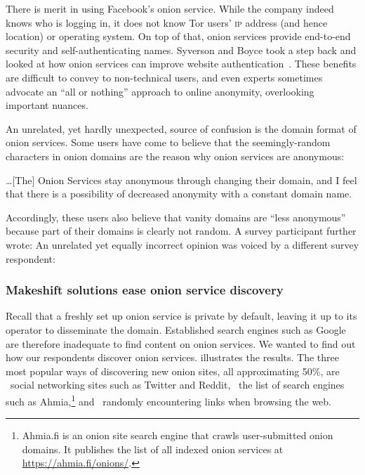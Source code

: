 There is merit in using Facebook's onion service.  While the company indeed
knows who is logging in, it does not know Tor users' \textsc{ip} address (and
hence location) or operating system.  On top of that, onion services provide
end-to-end security and self-authenticating names.  Syverson and Boyce took a
step back and looked at how onion services can improve website
authentication~\cite{Syverson2015a}.  These benefits are difficult to convey to
non-technical users, and even experts sometimes advocate an ``all or nothing''
approach to online anonymity, overlooking important nuances.

An unrelated, yet hardly unexpected, source of confusion is the domain format of
onion services.  Some users have come to believe that the seemingly-random
characters in onion domains are the reason why onion services are anonymous:

\begin{displayquote}
\ldots [The] Onion Services stay anonymous through changing their domain, and I
feel that there is a possibility of decreased anonymity with a constant domain
name.
\end{displayquote}

Accordingly, these users also believe that vanity domains are ``less anonymous''
because part of their domains is clearly not random.  A survey participant
further wrote:   An unrelated yet equally incorrect
opinion was voiced by a different survey respondent: 

\subsubsection{Makeshift solutions ease onion service discovery}

Recall that a freshly set up onion service is private by default, leaving it up
to its operator to disseminate the domain.  Established search engines such as
Google are therefore inadequate to find content on onion services.  We wanted to
find out how our respondents discover onion services.
 illustrates the results.  The three most popular ways
of discovering new onion sites, all approximating 50\%, are \first~social
networking sites such as Twitter and Reddit, \second~the list of search engines
such as Ahmia,\footnote{Ahmia.fi is an onion site search engine that crawls
user-submitted onion domains.  It publishes the list of all indexed onion
services at \url{https://ahmia.fi/onions/}.} and \third~randomly encountering
links when browsing the web.

